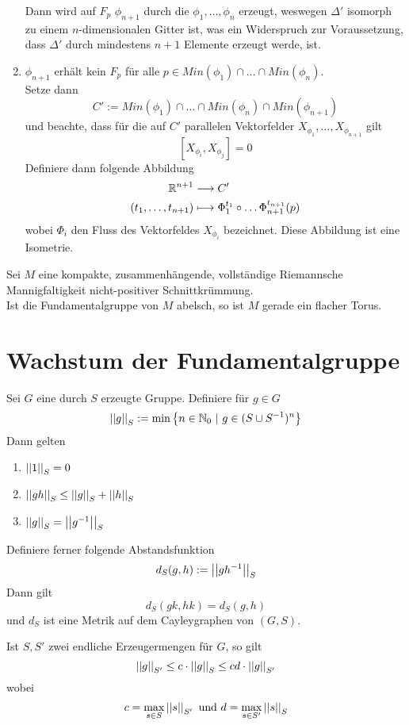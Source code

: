 \documentclass{book}
\begin{document}
\begin{Beweis}{}
\begin{enumerate}
Dann wird auf $F_p$ $\phi_{n+1}$ durch die $\phi_1,\ldots, \phi_n$ erzeugt, weswegen $\Delta'$ isomorph zu einem $n$-dimensionalen Gitter ist, was ein Widerspruch zur Voraussetzung, dass $\Delta'$ durch mindestens $n+1$ Elemente erzeugt werde, ist.
\item $\phi_{n+1}$ erhält kein $F_p$ für alle $p\in Min(\phi_1)\cap \ldots \cap Min(\phi_n)$.\\
Setze dann 
\[C':=  Min(\phi_1)\cap \ldots \cap Min(\phi_n)\cap Min(\phi_{n+1})\]
und beachte, dass für die auf $C'$ parallelen Vektorfelder $X_{\phi_1},\ldots, X_{\phi_{n+1}}$ gilt
\[ [X_{\phi_i}, X_{\phi_j}] = 0 \]
Definiere dann folgende Abbildung
\begin{align*}
\mathbb{R}^{n+1} & \overset{}{\longrightarrow} C'\\
(t_1,\ldots, t_{n+1}) & \longmapsto \Phi^{t_1}_1 \circ \ldots \Phi_{n+1}^{t_{n+1}} (p)
\end{align*}
wobei $\Phi_i$ den Fluss des Vektorfeldes $X_{\phi_i}$ bezeichnet. Diese Abbildung ist eine Isometrie.
\end{enumerate}
\end{Beweis}

\Kor{}
Sei $M$ eine kompakte, zusammenhängende, vollständige Riemannsche Mannigfaltigkeit nicht-positiver Schnittkrümmung.\\
Ist die Fundamentalgruppe von $M$ abelsch, so ist $M$ gerade ein flacher Torus.

\newpage
\section{Wachstum der Fundamentalgruppe}
\Def{}
Sei $G$ eine durch $S$ erzeugte Gruppe. Definiere für $g \in G$
\[ \norm{g}_S := \min \set{n\in \N_0}{g \in (S\cup S\i)^n} \]
Dann gelten
\begin{enumerate}[1.)]
\item $\left|\left|1\right|\right|_S = 0$
\item $\left|\left|gh\right|\right|_S \leq \left|\left|g\right|\right|_S + \left|\left|h\right|\right|_S$
\item $\left|\left|g\right|\right|_S = \left|\left|g^{-1}\right|\right|_S$
\end{enumerate}
Definiere ferner folgende Abstandsfunktion
\[ d_S(g,h):= \left|\left|gh^{-1}\right|\right|_S \]
Dann gilt
\[ d_S(gk,hk) = d_S(g,h) \]
und $d_S$ ist eine Metrik auf dem Cayleygraphen von $(G,S)$.

\Lem{}
Ist $S,S'$ zwei endliche Erzeugermengen für $G$, so gilt
\[ \left|\left|g\right|\right|_{S'} \leq c \cdot \left|\left|g\right|\right|_{S} \leq cd \cdot \left|\left|g\right|\right|_{S'} \]
wobei
\[ c= \max_{s\in S}\left|\left|s\right|\right|_{S'} \text{ und } d = \max_{s\in S'} \left|\left|s\right|\right|_S \]
\end{document}
